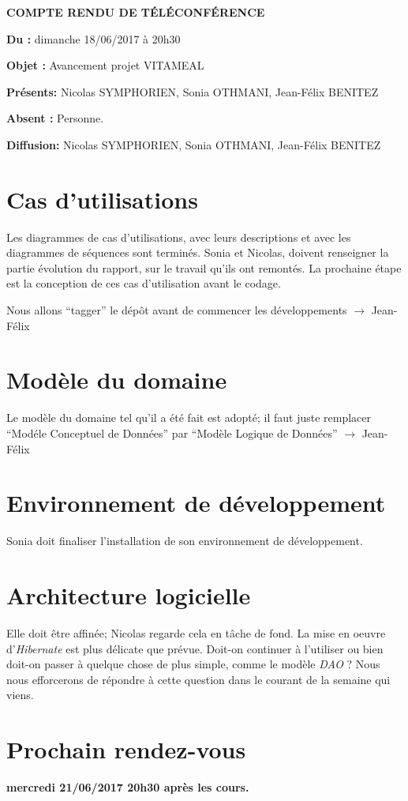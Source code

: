 \documentclass[11pt,a4paper,french,twoside,openright]{article}
\begin{document}
\pagestyle{fancy}

\begin{center}\bfseries\Huge
COMPTE RENDU DE TÉLÉCONFÉRENCE
\end{center}

\textbf{Du      :} dimanche 18/06/2017 à 20h30

\textbf{Objet   :} Avancement projet VITAMEAL

\textbf{Présents:} Nicolas SYMPHORIEN, Sonia OTHMANI, Jean-Félix BENITEZ

\textbf{Absent :} Personne.

\textbf{Diffusion:} Nicolas SYMPHORIEN, Sonia OTHMANI, Jean-Félix BENITEZ

\hrulefill

\section{Cas d'utilisations}
Les diagrammes de cas d'utilisations, avec leurs descriptions et avec les diagrammes de séquences sont terminés.
Sonia et Nicolas, doivent renseigner la partie évolution du rapport, sur le travail qu'ils ont remontés.
La prochaine étape est la conception de ces cas d'utilisation avant le codage.

Nous allons \enquote{tagger} le dépôt avant de commencer les développements $\rightarrow$ Jean-Félix

\section{Modèle du domaine}
Le modèle du domaine tel qu'il a été fait est adopté; il faut juste remplacer \enquote{Modéle Conceptuel de Données} par \enquote{Modèle Logique de Données} $\rightarrow$ Jean-Félix

\section{Environnement de développement}
Sonia doit finaliser l'installation de son environnement de développement.

\section{Architecture logicielle}
Elle doit être affinée; Nicolas regarde cela en tâche de fond.
La mise en oeuvre d'\emph{Hibernate} est plus délicate que prévue. Doit-on continuer à l'utiliser ou bien doit-on passer à quelque chose de plus simple, comme le modèle \emph{DAO} ?
Nous nous efforcerons de répondre à cette question dans le courant de la semaine qui viens.

\section{Prochain rendez-vous}
\textbf{mercredi 21/06/2017 20h30 après les cours.}

\label{LastPage}
\end{document}
